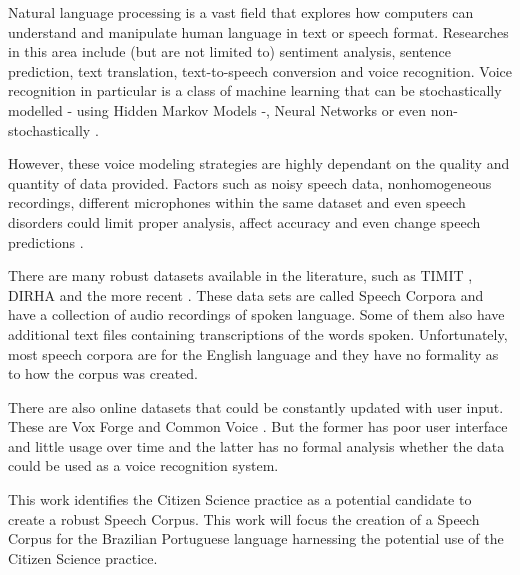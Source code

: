 Natural language processing is a vast field that explores how computers can understand and manipulate human language in text or speech format. Researches in this area include (but are not limited to) sentiment analysis, sentence prediction, text translation, text-to-speech conversion and voice recognition. Voice recognition in particular is a class of machine learning that can be stochastically modelled - using Hidden Markov Models \cite{gales2008application} -, Neural Networks \cite{graves2013speech} or even non-stochastically \cite{burget2003nonrandomattr}.

However, these voice modeling strategies are highly dependant on the quality and quantity of data provided. Factors such as noisy speech data, nonhomogeneous recordings, different microphones within the same dataset and even speech disorders could limit proper analysis, affect accuracy and even change speech predictions \cite{wrong}. 



There are many robust datasets available in the literature, such as TIMIT \cite{Lamel1992timmit}, DIRHA \cite{Ravanelli2016dirha} and the more recent \cite{chanchaochai2018globaltimit}. These data sets are called Speech Corpora and have a collection of audio recordings of spoken language. Some of them also have additional text files containing transcriptions of the words spoken.
Unfortunately, most speech corpora are for the English language \cite{LeRouxVincent2014TRdatasets} and they have no formality as to how the corpus was created.

There are also online datasets that could be constantly updated with user input. These are Vox Forge \cite{asd} and Common Voice \cite{mozilla}. But the former has poor user interface and little usage over time and the latter has no formal analysis whether the data could be used as a voice recognition system.

This work identifies the Citizen Science practice as a potential candidate to create a robust Speech Corpus.
This work will focus the creation of a Speech Corpus for the Brazilian Portuguese language harnessing the potential use of the Citizen Science practice.

